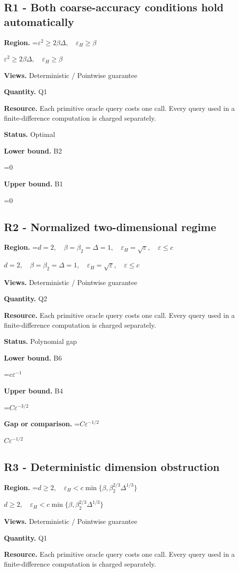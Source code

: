 \documentclass[10pt,a4paper]{article}
\newcommand{\AtlasMath}[1]{\par\begingroup\centering\setbox0=\hbox{$\displaystyle #1$}\ifdim\wd0>1.4\linewidth\typeout{ATLAS WIDE FORMULA: \the\wd0}\fi\ifdim\wd0>\linewidth\resizebox{\linewidth}{!}{\box0}\else\box0\fi\par\endgroup}
\newcommand{\AtlasInlineMath}[1]{\begingroup\setbox0=\hbox{$#1$}\ifdim\wd0>.4\linewidth\endgroup\AtlasMath{#1}\else\endgroup$#1$\fi}
\begin{document}
\subsection{R1 - Both coarse-accuracy conditions hold automatically}
\textbf{Region.} \AtlasInlineMath{\varepsilon^2\ge2\beta\Delta,\quad\varepsilon_H\ge\beta}

\textbf{Views.} Deterministic / Pointwise guarantee

\textbf{Quantity.} Q1

\textbf{Resource.} Each primitive oracle query costs one call. Every query used in a finite-difference computation is charged separately.

\textbf{Status.} Optimal

\textbf{Lower bound.} B2

\AtlasMath{0}
\textbf{Upper bound.} B1

\AtlasMath{0}
\subsection{R2 - Normalized two-dimensional regime}
\textbf{Region.} \AtlasInlineMath{d=2,\quad\beta=\beta_2=\Delta=1,\quad\varepsilon_H=\sqrt\varepsilon,\quad\varepsilon\le c}

\textbf{Views.} Deterministic / Pointwise guarantee

\textbf{Quantity.} Q2

\textbf{Resource.} Each primitive oracle query costs one call. Every query used in a finite-difference computation is charged separately.

\textbf{Status.} Polynomial gap

\textbf{Lower bound.} B6

\AtlasMath{c\varepsilon^{-1}}
\textbf{Upper bound.} B4

\AtlasMath{C\varepsilon^{-3/2}}
\textbf{Gap or comparison.} \AtlasInlineMath{C\varepsilon^{-1/2}}

\subsection{R3 - Deterministic dimension obstruction}
\textbf{Region.} \AtlasInlineMath{d\ge2,\quad\varepsilon_H<c\min\{\beta,\beta_2^{2/3}\Delta^{1/3}\}}

\textbf{Views.} Deterministic / Pointwise guarantee

\textbf{Quantity.} Q1

\textbf{Resource.} Each primitive oracle query costs one call. Every query used in a finite-difference computation is charged separately.
\end{document}
